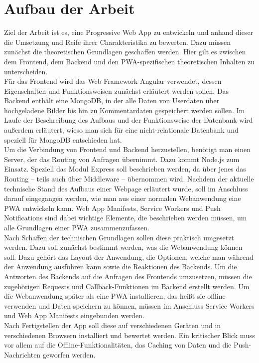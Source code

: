 \section{Aufbau der Arbeit}\label{se:AufbauDerArbeit}
Ziel der Arbeit ist es, eine Progressive Web App zu entwickeln und anhand dieser die Umsetzung und Reife ihrer Charakteristika zu bewerten. 
Dazu müssen zunächst die theoretischen Grundlagen geschaffen werden. Hier gilt es zwischen dem Frontend, dem Backend und den PWA-spezifischen theoretischen Inhalten zu unterscheiden.\\
Für das Frontend wird das Web-Framework Angular verwendet, dessen Eigenschaften und Funktionsweisen zunächst erläutert werden sollen. Das Backend enthält eine MongoDB, in der alle Daten von Userdaten über hochgeladene Bilder bis hin zu Kommentardaten gespeichert werden sollen. Im Laufe der Beschreibung des Aufbaus und der Funktionsweise der Datenbank wird außerdem erläutert, wieso man sich für eine nicht-relationale Datenbank und speziell für MongoDB entschieden hat.\\
Um die Verbindung von Frontend und Backend herzustellen, benötigt man einen Server, der das Routing von Anfragen übernimmt. Dazu kommt Node.js zum Einsatz. Speziell das Modul Express soll beschrieben werden, da über jenes das Routing – teils auch über Middleware – übernommen wird.
Nachdem der aktuelle technische Stand des Aufbaus einer Webpage erläutert wurde, soll im Anschluss darauf eingegangen werden, wie man aus einer normalen Webanwendung eine PWA entwickeln kann. Web App Manifests, Service Workers und Push Notifications sind dabei wichtige Elemente, die beschrieben werden müssen, um alle Grundlagen einer PWA zusammenzufassen. \\
Nach Schaffen der technischen Grundlagen sollen diese praktisch umgesetzt werden. Dazu soll zunächst bestimmt werden, was die Webanwendung können soll. Dazu gehört das Layout der Anwendung, die Optionen, welche man während der Anwendung ausführen kann sowie die Reaktionen des Backends. Um die Antworten des Backends auf die Anfragen des Frontends umzusetzen, müssen die zugehörigen Requests und Callback-Funktionen im Backend erstellt werden. Um die Webanwendung später als eine PWA installieren, das heißt sie offline verwenden und Daten speichern zu können, müssen im Anschluss Service Workers und Web App Manifests eingebunden werden.\\
Nach Fertigstellen der App soll diese auf verschiedenen Geräten und in verschiedenen Browsern installiert und bewertet werden. Ein kritischer Blick muss vor allem auf die Offline-Funktionalitäten, das Caching von Daten und die Push-Nachrichten geworfen werden. 
